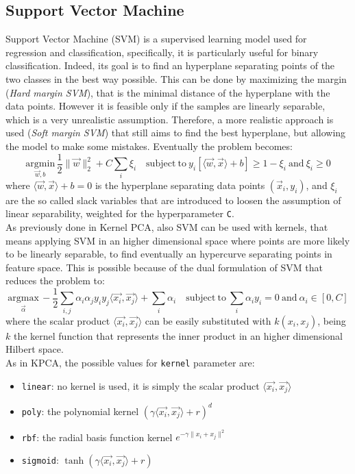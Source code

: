 \documentclass[letterpaper]{article}
\begin{document}
	\subsection{Support Vector Machine} \label{svm}
	Support Vector Machine (SVM) is a supervised learning model used for regression and classification, specifically, it is particularly useful for binary classification. Indeed, its goal is to find an hyperplane separating points of the two classes in the best way possible. This can be done by maximizing the margin (\emph{Hard margin SVM}), that is the minimal distance of the hyperplane with the data points. However it is feasible only if the samples are linearly separable, which is a very unrealistic assumption. Therefore, a more realistic approach is used (\emph{Soft margin SVM}) that still aims to find the best hyperplane, but allowing the model to make some mistakes. Eventually the problem becomes:
	\begin{equation}
		\underset{\vec{w}, b}{\mathrm{argmin}}\, \frac{1}{2}\lVert\vec{w}\rVert_2^2 + C\sum_{i}\xi_i \quad \mathrm{subject\ to\ }y_i[\langle \vec{w},\vec{x}\rangle+b]\ge1-\xi_i \mathrm{\ and\ } \xi_i\ge0
	\end{equation}
	where $\langle\vec{w},\vec{x}\rangle+b = 0$ is the hyperplane separating data points $(\vec{x}_i,y_i)$, and $\xi_i$ are the so called slack variables that are introduced to loosen the assumption of linear separability, weighted for the hyperparameter \texttt{C}.\\
	As previously done in Kernel PCA, also SVM can be used with kernels, that means applying SVM in an higher dimensional space where points are more likely to be linearly separable, to find eventually an hypercurve separating points in feature space. This is possible because of the dual formulation of SVM that reduces the problem to:
	\begin{equation}
		\underset{\vec{\alpha}}{\mathrm{argmax}}\, -\frac{1}{2}\sum_{i,j}\alpha_i\alpha_jy_iy_j\langle\vec{x_i},\vec{x_j}\rangle + \sum_{i}\alpha_i \quad \mathrm{subject\ to\ } \sum_{i}\alpha_iy_i=0 \mathrm{\ and\ } \alpha_i\in[0,C]
	\end{equation}
	where the scalar product $\langle\vec{x_i},\vec{x_j}\rangle$ can be easily substituted with $k(x_i,x_j)$, being $k$ the kernel function that represents the inner product in an higher dimensional Hilbert space. \\
	As in KPCA, the possible values for \texttt{kernel} parameter are:
	\begin{itemize}
		\item \texttt{linear}: no kernel is used, it is simply the scalar product $\langle\vec{x_i},\vec{x_j}\rangle$
		\item \texttt{poly}: the polynomial kernel $(\gamma\langle\vec{x_i},\vec{x_j}\rangle+r)^d$
		\item \texttt{rbf}: the radial basis function kernel $e^{-\gamma\lVert x_i+x_j\rVert^2}$
		\item \texttt{sigmoid}: $\tanh(\gamma\langle\vec{x_i},\vec{x_j}\rangle+r)$
	\end{itemize}
\end{document}
